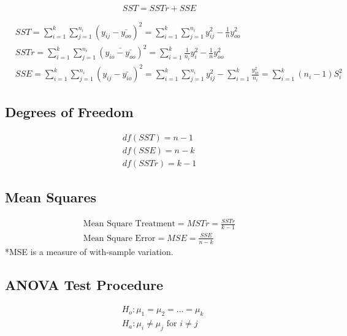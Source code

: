 \documentclass{article}
\begin{document}
            \begin{equation*}
                SST = SSTr + SSE
            \end{equation*}

            \begin{align*}
                &SST = \sum_{i=1}^{k}\sum_{j=1}^{n_{i}} (y_{ij}- \bar{y_{oo}})^{2} =  \sum_{i=1}^{k}\sum_{j=1}^{n_{i}}  y_{ij}^{2} - \frac{1}{n}y_{oo}^{2}\\
                &SSTr = \sum_{i=1}^{k}\sum_{j=1}^{n_{i}} (\bar{y_{io} - \bar{y_{oo}}})^{2} =  \sum_{i=1}^{k} \frac{1}{n_{i}} y_{i}^{2} - \frac{1}{n} y_{oo}^{2}\\
                &SSE =  \sum_{i=1}^{k}\sum_{j=1}^{n_{i}} (y_{ij} - \bar{y_{io}})^{2} =  \sum_{i=1}^{k}\sum_{j=1}^{n_{i}} y_{ij}^{2} - \sum_{i=1}^{k} \frac{y_{io}^{2}}{n_{i}} = \sum_{i=1}^{k} (n_{i} - 1)S_{i}^{2}
            \end{align*}

            \subsection*{Degrees of Freedom}
            \begin{align*}
                df(SST) = n-1\\
                df(SSE) = n-k\\
                df(SSTr) = k-1
            \end{align*}

            \subsection*{Mean Squares}
            \begin{align*}
                \text{Mean Square Treatment} = MSTr = \frac{SSTr}{k-1}\\
                \text{Mean Square Error} = MSE = \frac{SSE}{n-k}
            \end{align*}
            *MSE is a measure of with-sample variation.

            \subsection*{ANOVA Test Procedure}
            \begin{align*}
                &H_{o}: \mu_{1} = \mu_{2} = \dots = \mu_{k}\\
                &H_{a}: \mu_{i} \neq \mu_{j} \text{ for } i\neq j
            \end{align*}
\end{document}
